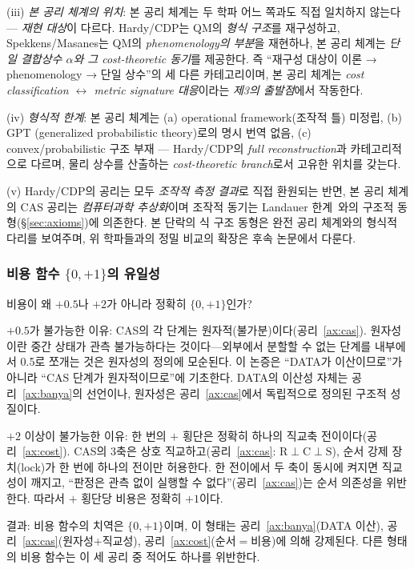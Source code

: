 \documentclass[entropy,article,submit,pdftex,oneauthor]{Definitions/mdpi}
\begin{document}
(iii) \emph{본 공리 체계의 위치}: 본 공리 체계는 두 학파 어느 쪽과도 직접 일치하지 않는다 — \emph{재현 대상}이 다르다. Hardy/CDP는 QM의 \emph{형식 구조}를 재구성하고, Spekkens/Masanes는 QM의 \emph{phenomenology의 부분}을 재현하나, 본 공리 체계는 \emph{단일 결합상수 $\alpha$와 그 cost-theoretic 동기}를 제공한다. 즉 ``재구성 대상이 이론 → phenomenology → 단일 상수''의 세 다른 카테고리이며, 본 공리 체계는 \emph{cost classification $\leftrightarrow$ metric signature 대응}이라는 \emph{제3의 출발점}에서 작동한다.

(iv) \emph{형식적 한계}: 본 공리 체계는 (a) operational framework(조작적 틀) 미정립, (b) GPT (generalized probabilistic theory)로의 명시 번역 없음, (c) convex/probabilistic 구조 부재 — Hardy/CDP의 \emph{full reconstruction}과 카테고리적으로 다르며, 물리 상수를 산출하는 \emph{cost-theoretic branch}로서 고유한 위치를 갖는다.

(v) Hardy/CDP의 공리는 모두 \emph{조작적 측정 결과}로 직접 환원되는 반면, 본 공리 체계의 CAS 공리는 \emph{컴퓨터과학 추상화}이며 조작적 동기는 Landauer 한계~\cite{landauer1961}와의 구조적 동형(\S\ref{sec:axioms})에 의존한다. 본 단락의 식 구조 동형은 완전 공리 체계와의 형식적 다리를 보여주며, 위 학파들과의 정밀 비교의 확장은 후속 논문에서 다룬다.

\subsubsection{비용 함수 $\{0, +1\}$의 유일성}

비용이 왜 $+0.5$나 $+2$가 아니라 정확히 $\{0, +1\}$인가?

$+0.5$가 불가능한 이유: CAS의 각 단계는 원자적(불가분)이다(공리~\ref{ax:cas}). 원자성이란 중간 상태가 관측 불가능하다는 것이다---외부에서 분할할 수 없는 단계를 내부에서 0.5로 쪼개는 것은 원자성의 정의에 모순된다. 이 논증은 ``DATA가 이산이므로''가 아니라 ``CAS 단계가 원자적이므로''에 기초한다. DATA의 이산성 자체는 공리~\ref{ax:banya}의 선언이나, 원자성은 공리~\ref{ax:cas}에서 독립적으로 정의된 구조적 성질이다.

$+2$ 이상이 불가능한 이유: 한 번의 $+$ 횡단은 정확히 하나의 직교축 전이이다(공리~\ref{ax:cost}). CAS의 3축은 상호 직교하고(공리~\ref{ax:cas}: $\mathrm{R} \perp \mathrm{C} \perp \mathrm{S}$), 순서 강제 장치(lock)가 한 번에 하나의 전이만 허용한다. 한 전이에서 두 축이 동시에 켜지면 직교성이 깨지고, ``판정은 관측 없이 실행할 수 없다''(공리~\ref{ax:cas})는 순서 의존성을 위반한다. 따라서 $+$ 횡단당 비용은 정확히 $+1$이다.

결과: 비용 함수의 치역은 $\{0, +1\}$이며, 이 형태는 공리~\ref{ax:banya}(DATA 이산), 공리~\ref{ax:cas}(원자성+직교성), 공리~\ref{ax:cost}(순서$=$비용)에 의해 강제된다. 다른 형태의 비용 함수는 이 세 공리 중 적어도 하나를 위반한다.
\end{document}
